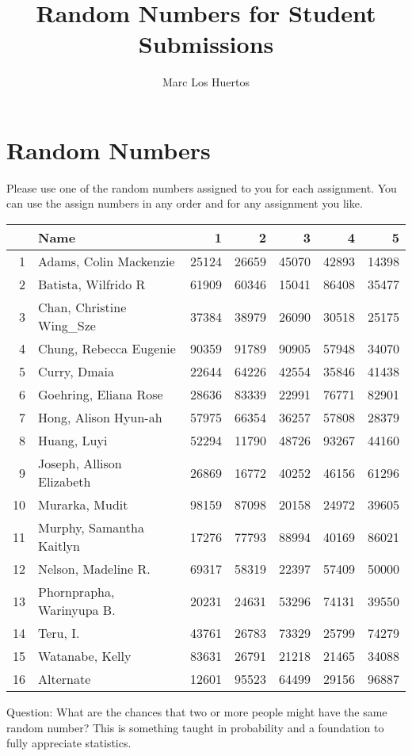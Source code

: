 \documentclass{article}\usepackage[]{graphicx}\usepackage[]{color}
\title{Random Numbers for Student Submissions}
\author{Marc Los Huertos}
\begin{document}
\maketitle


\section*{Random Numbers}

Please use one of the random numbers assigned to you for each assignment. You can use the assign numbers in any order and for any assignment you like. 

\begin{table}[ht]
\centering
\begin{tabular}{rlrrrrr}
  \hline
 & Name & 1 & 2 & 3 & 4 & 5 \\ 
  \hline
1 & Adams, Colin Mackenzie & 25124 & 26659 & 45070 & 42893 & 14398 \\ 
  2 & Batista, Wilfrido R & 61909 & 60346 & 15041 & 86408 & 35477 \\ 
  3 & Chan, Christine Wing\_Sze & 37384 & 38979 & 26090 & 30518 & 25175 \\ 
  4 & Chung, Rebecca Eugenie & 90359 & 91789 & 90905 & 57948 & 34070 \\ 
  5 & Curry, Dmaia & 22644 & 64226 & 42554 & 35846 & 41438 \\ 
  6 & Goehring, Eliana Rose & 28636 & 83339 & 22991 & 76771 & 82901 \\ 
  7 & Hong, Alison Hyun-ah & 57975 & 66354 & 36257 & 57808 & 28379 \\ 
  8 & Huang, Luyi & 52294 & 11790 & 48726 & 93267 & 44160 \\ 
  9 & Joseph, Allison Elizabeth & 26869 & 16772 & 40252 & 46156 & 61296 \\ 
  10 & Murarka, Mudit & 98159 & 87098 & 20158 & 24972 & 39605 \\ 
  11 & Murphy, Samantha Kaitlyn & 17276 & 77793 & 88994 & 40169 & 86021 \\ 
  12 & Nelson, Madeline R. & 69317 & 58319 & 22397 & 57409 & 50000 \\ 
  13 & Phornprapha, Warinyupa B. & 20231 & 24631 & 53296 & 74131 & 39550 \\ 
  14 & Teru, I. & 43761 & 26783 & 73329 & 25799 & 74279 \\ 
  15 & Watanabe, Kelly & 83631 & 26791 & 21218 & 21465 & 34088 \\ 
  16 & Alternate & 12601 & 95523 & 64499 & 29156 & 96887 \\ 
   \hline
\end{tabular}
\end{table}


Question: What are the chances that two or more people might have the same random number?  This is something taught in probability and a foundation to fully appreciate statistics.
\end{document}
